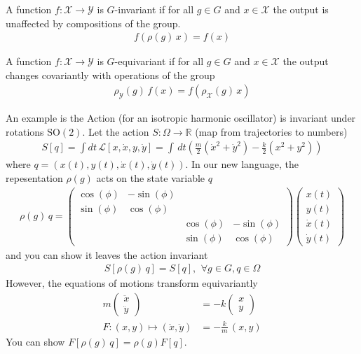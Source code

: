 \begin{definition}
	[Invariance]
	A function $f: \mathcal X \to \mathcal Y$ is $G$-invariant if for all $g \in G$ and $x \in \mathcal X$ the output is unaffected by compositions of the group.
	\begin{align}
		f(\rho(g)\, x) = f(x)
	\end{align}
\end{definition}
\begin{definition}
	[Equivariance] A function $f : \mathcal X \to \mathcal Y$ is $G$-equivariant if for all $g \in G$ and $x \in \mathcal X$ the output changes covariantly with operations of the group
	\begin{align}
		\rho_{\mathcal Y}(g) \, f(x) = f(\rho_{\mathcal X}(g) \, x)
	\end{align}
\end{definition}
An example is the Action (for an isotropic harmonic oscillator) is invariant under rotations $\text{SO}(2)$. Let the action $ S: \Omega \to \mathbb R$ (map from trajectories to numbers)
\begin{align}
	S[q] = \int dt\, \mathcal L[x, \dot x, y, \dot y]  = \int\, dt  \left(\frac{m}{2} (\dot x^2 + \dot y^2) - \frac{k}{2} (x^2 + y^2) \right) 
\end{align}
where $q = (x(t), y(t), \dot x(t), \dot y(t))$. In our new language, the repesentation $\rho(g)$ acts on the state variable $q$
\begin{align}
	\rho(g) \, q = \begin{pmatrix}
		\cos(\phi) & - \sin(\phi) & &  \\ \sin(\phi) & \cos(\phi) &  & \\
		& & \cos(\phi) & - \sin(\phi) \\ & & \sin(\phi) & \cos(\phi)
	\end{pmatrix} \begin{pmatrix}
		x(t) \\ y(t) \\ \dot x(t) \\ \dot y(t)
	\end{pmatrix}
\end{align}
and you can show it leaves the action invariant
\begin{align}
	S[\rho(g) \, q] = S[q], \  \, \forall g \in G, q \in \Omega
\end{align}
However, the equations of motions transform equivariantly
\begin{align}
	m \begin{pmatrix}
		\ddot x \\ \ddot y 
	\end{pmatrix} & = -k \begin{pmatrix}
		x  \\ y
	\end{pmatrix}\\
	F : (x,y) \mapsto (\ddot x , \ddot y) & = - \frac{k}{m}\, (x,y)
\end{align} You can show $F[\rho(g) \, q] = \rho(g) F[q]$.

